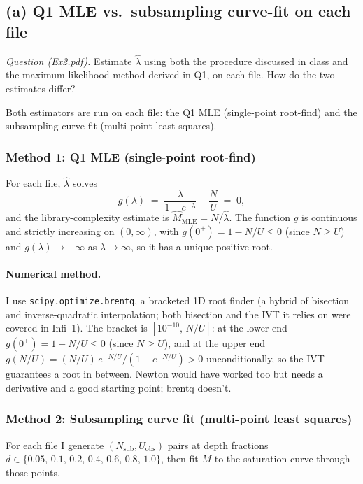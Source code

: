 \documentclass[11pt,a4paper]{article}
\newcommand{\hlam}{\hat{\lambda}}
\newcommand{\hM}{\hat{M}}
\newcommand{\Nsub}{N_{\mathrm{sub}}}
\newcommand{\Uobs}{U_{\mathrm{obs}}}
\begin{document}
\subsection{(a) Q1 MLE vs.\ subsampling curve-fit on each file}
\emph{Question (Ex2.pdf).} Estimate $\hat\lambda$ using both the procedure
discussed in class and the maximum likelihood method derived in Q1, on each
file. How do the two estimates differ?

Both estimators are run on each file: the Q1 MLE (single-point root-find) and the
subsampling curve fit (multi-point least squares).

\subsubsection*{Method 1: Q1 MLE (single-point root-find)}

For each file, $\hlam$ solves
\[
   g(\lambda) \;=\; \dfrac{\lambda}{1 - e^{-\lambda}} - \dfrac{N}{U} \;=\; 0,
\]
and the library-complexity estimate is $\hM_{\text{MLE}} = N / \hlam$. The function
$g$ is continuous and strictly increasing on $(0,\infty)$, with
$g(0^{+}) = 1 - N/U \leq 0$ (since $N \geq U$) and $g(\lambda) \to +\infty$ as
$\lambda \to \infty$, so it has a unique positive root.

\paragraph{Numerical method.}
I use \texttt{scipy.optimize.brentq}, a bracketed 1D root finder (a hybrid of
bisection and inverse-quadratic interpolation; both bisection and the IVT it
relies on were covered in Infi~1). The bracket is $[10^{-10},\, N/U]$: at the
lower end $g(0^{+}) = 1 - N/U \le 0$ (since $N \ge U$), and at the upper end
$g(N/U) = (N/U)\,e^{-N/U}/(1 - e^{-N/U}) > 0$ unconditionally, so the IVT
guarantees a root in between. Newton would have worked too but needs a derivative
and a good starting point; brentq doesn't.

\subsubsection*{Method 2: Subsampling curve fit (multi-point least squares)}

For each file I generate $(\Nsub, \Uobs)$ pairs at depth fractions
$d \in \{0.05,\, 0.1,\, 0.2,\, 0.4,\, 0.6,\, 0.8,\, 1.0\}$, then fit $M$ to the
saturation curve through those points.
\end{document}
